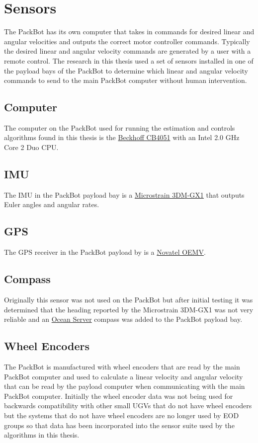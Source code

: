 \section{Sensors}
\label{sec:bgSensors}
The PackBot has its own computer that takes in commands for desired linear and angular velocities and outputs the correct motor controller commands. Typically the desired linear and angular velocity commands are generated by a user with a remote control. The research in this thesis used a set of sensors installed in one of the payload bays of the PackBot to determine which linear and angular velocity commands to send to the main PackBot computer without human intervention.

\subsection{Computer}
\label{sec:bgComputer}
The computer on the PackBot used for running the estimation and controls algorithms found in this thesis is the \href{http://www.beckhoff.com/english.asp?motherboards/cb4051.htm}{Beckhoff CB4051} with an Intel 2.0 GHz Core 2 Duo CPU.

\subsection{IMU}
\label{sec:bgIMU}
The IMU in the PackBot payload bay is a \href{http://www.microstrain.com/3dm-gx1.aspx}{Microstrain 3DM-GX1} that outputs Euler angles and angular rates.

\subsection{GPS}
\label{sec:bgGPS}
The GPS receiver in the PackBot payload by is a \href{http://www.novatel.com/products/gnss-receivers/oem-receiver-boards/oemv-receivers/}{Novatel OEMV}.

\subsection{Compass}
\label{sec:bgCompass}
Originally this sensor was not used on the PackBot but after initial testing it was determined that the heading reported by the Microstrain 3DM-GX1 was not very reliable and an \href{http://www.oceanserver-store.com/os3axdico3.html}{Ocean Server} compass was added to the PackBot payload bay.

\subsection{Wheel Encoders}
\label{sec:bgEncoders}
The PackBot is manufactured with wheel encoders that are read by the main PackBot computer and used to calculate a linear velocity and angular velocity that can be read by the payload computer when communicating with the main PackBot computer. Initially the wheel encoder data was not being used for backwards compatibility with other small UGVs that do not have wheel encoders but the systems that do not have wheel encoders are no longer used by EOD groups so that data has been incorporated into the sensor suite used by the algorithms in this thesis.

